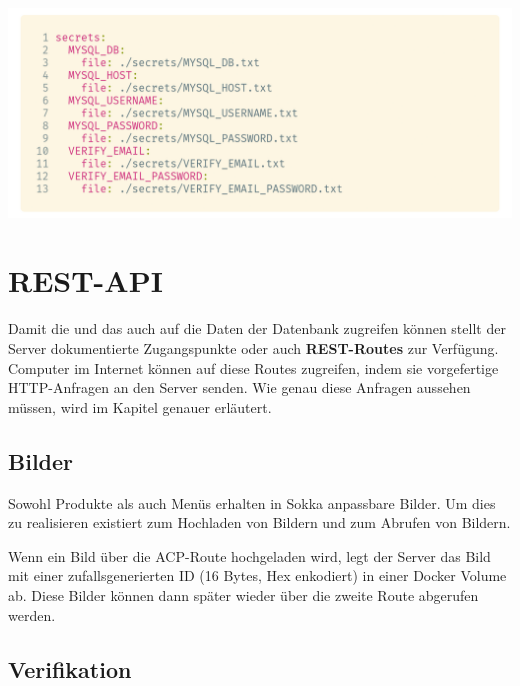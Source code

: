 \begin{code}[htp]
    \begin{center}
        \includegraphics[width=1\textwidth]{images/Backend/secrets.png}
        \vspace{-25pt}
        \caption{Sokkas Docker Secrets in der \lstinline{docker-compose.yml}}
    \end{center}
\end{code}

\section{REST-API}

Damit die \textit{} und das \textit{} auch auf die Daten der Datenbank zugreifen können stellt der Server dokumentierte Zugangspunkte oder auch \textbf{REST-Routes} zur Verfügung. Computer im Internet können auf diese Routes zugreifen, indem sie vorgefertige HTTP-Anfragen an den Server senden. Wie genau diese Anfragen aussehen müssen, wird im Kapitel \textit{} genauer erläutert.

\subsection{Bilder}

Sowohl Produkte als auch Menüs erhalten in Sokka anpassbare Bilder. Um dies zu realisieren existiert \textit{} zum Hochladen von Bildern und \textit{} zum Abrufen von Bildern.

Wenn ein Bild über die ACP-Route hochgeladen wird, legt der Server das Bild mit einer zufallsgenerierten ID (16 Bytes, Hex enkodiert) in einer Docker Volume ab. Diese Bilder können dann später wieder über die zweite Route abgerufen werden.

\subsection{Verifikation}
\label{verification}

